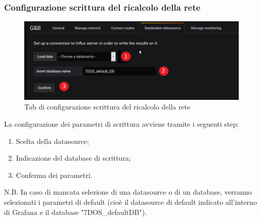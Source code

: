 \subsubsection{Configurazione scrittura del ricalcolo della rete}
\begin{figure} [H]
	\centering
	\includegraphics[scale=0.55]{Img/setds} 
	\caption{Tab di configurazione scrittura del ricalcolo della rete} \label{} 
\end{figure} 
La configurazione dei parametri di scrittura avviene tramite i seguenti step:
\begin{enumerate}
	\item Scelta della datasource;
	\item Indicazione del database di scrittura;
	\item Conferma dei parametri.
\end{enumerate}

N.B. In caso di mancata selezione di una datasource o di un database, verranno selezionati i parametri di default (cioè il datasource di default indicato all'interno di Grafana e il database "7DOS\_defaultDB").